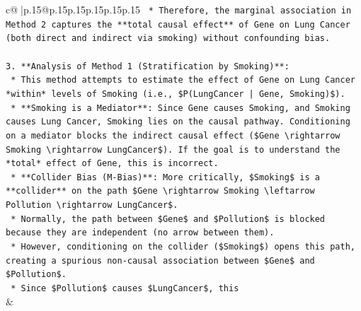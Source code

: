 \documentclass{article}
\begin{document}
{\begin{supertabular}{c@{$\;$}|p{.15\linewidth}@{}p{.15\linewidth}p{.15\linewidth}p{.15\linewidth}p{.15\linewidth}p{.15\linewidth}}
{{{\texttt{    *   Therefore, the marginal association in Method 2 captures the **total causal effect** of Gene on Lung Cancer (both direct and indirect via smoking) without confounding bias.} \\
\\ 
\texttt{3.  **Analysis of Method 1 (Stratification by Smoking)**:} \\
\texttt{    *   This method attempts to estimate the effect of Gene on Lung Cancer *within* levels of Smoking (i.e., \$P(LungCancer | Gene, Smoking)\$).} \\
\texttt{    *   **Smoking is a Mediator**: Since Gene causes Smoking, and Smoking causes Lung Cancer, Smoking lies on the causal pathway. Conditioning on a mediator blocks the indirect causal effect (\$Gene \textbackslash{}rightarrow Smoking \textbackslash{}rightarrow LungCancer\$). If the goal is to understand the *total* effect of Gene, this is incorrect.} \\
\texttt{    *   **Collider Bias (M{-}Bias)**: More critically, \$Smoking\$ is a **collider** on the path \$Gene \textbackslash{}rightarrow Smoking \textbackslash{}leftarrow Pollution \textbackslash{}rightarrow LungCancer\$.} \\
\texttt{        *   Normally, the path between \$Gene\$ and \$Pollution\$ is blocked because they are independent (no arrow between them).} \\
\texttt{        *   However, conditioning on the collider (\$Smoking\$) opens this path, creating a spurious non{-}causal association between \$Gene\$ and \$Pollution\$.} \\
\texttt{        *   Since \$Pollution\$ causes \$LungCancer\$, this} \\
            }
        }
    }
    & \\ \\


\end{supertabular}}
\end{document}
